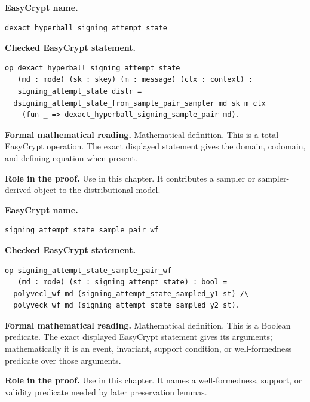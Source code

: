 \begin{formaldefinition}
\noindent\textbf{EasyCrypt name.}
\begin{lstlisting}[language=EasyCrypt,basicstyle=\ttfamily\scriptsize]
dexact_hyperball_signing_attempt_state
\end{lstlisting}
\noindent\textbf{Checked EasyCrypt statement.}
\begin{lstlisting}[language=EasyCrypt,basicstyle=\ttfamily\scriptsize]
op dexact_hyperball_signing_attempt_state
   (md : mode) (sk : skey) (m : message) (ctx : context) :
   signing_attempt_state distr =
  dsigning_attempt_state_from_sample_pair_sampler md sk m ctx
    (fun _ => dexact_hyperball_signing_sample_pair md).
\end{lstlisting}
\noindent\textbf{Formal mathematical reading.}
Mathematical definition. This is a total EasyCrypt operation.  The exact displayed statement gives the domain, codomain, and defining equation when present.

\noindent\textbf{Role in the proof.}
Use in this chapter. It contributes a sampler or sampler-derived object to the distributional model.

\end{formaldefinition}

\begin{formaldefinition}
\noindent\textbf{EasyCrypt name.}
\begin{lstlisting}[language=EasyCrypt,basicstyle=\ttfamily\scriptsize]
signing_attempt_state_sample_pair_wf
\end{lstlisting}
\noindent\textbf{Checked EasyCrypt statement.}
\begin{lstlisting}[language=EasyCrypt,basicstyle=\ttfamily\scriptsize]
op signing_attempt_state_sample_pair_wf
   (md : mode) (st : signing_attempt_state) : bool =
  polyvecl_wf md (signing_attempt_state_sampled_y1 st) /\
  polyveck_wf md (signing_attempt_state_sampled_y2 st).
\end{lstlisting}
\noindent\textbf{Formal mathematical reading.}
Mathematical definition. This is a Boolean predicate.  The exact displayed EasyCrypt statement gives its arguments; mathematically it is an event, invariant, support condition, or well-formedness predicate over those arguments.

\noindent\textbf{Role in the proof.}
Use in this chapter. It names a well-formedness, support, or validity predicate needed by later preservation lemmas.

\end{formaldefinition}

